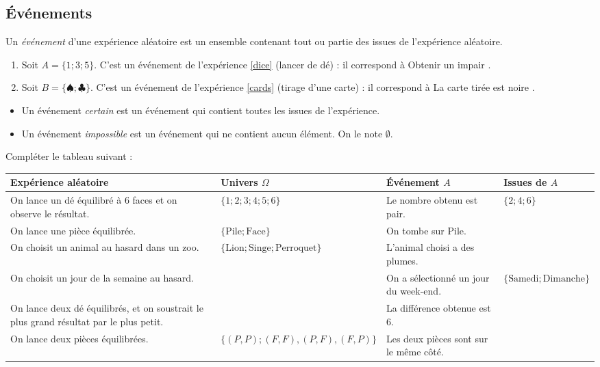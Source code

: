 \documentclass{article}
\begin{document}
\subsection{\'Evénements}
\begin{definition}
Un \emph{événement} d'une expérience aléatoire est un ensemble contenant tout ou partie des issues de l'expérience aléatoire.
\end{definition}
\begin{example}
\begin{enumerate}
\item Soit $A = \{1;3;5\}$. C'est un événement de l'expérience \ref{dice} (lancer de dé) : il correspond à \og Obtenir un impair \fg.
\item Soit $B = \{♠;♣\}$. C'est un événement de l'expérience \ref{cards} (tirage d'une carte) : il correspond à \og La carte tirée est noire \fg.
\end{enumerate}
\end{example}
\begin{vocabulary}
\begin{itemize}
\item Un événement \emph{certain} est un événement qui contient toutes les issues de l'expérience.  
\item Un événement \emph{impossible} est un événement qui ne contient aucun élément. On le note $\emptyset$.
\end{itemize}
\end{vocabulary}
\begin{exercize}
Compléter le tableau suivant :
\begin{center}
\begin{tabular}{|C{0.25\textwidth}|C{0.3\textwidth}|C{0.2\textwidth}|C{0.2\textwidth}|}
\hline
Expérience aléatoire & Univers $\Omega$ & \'Evénement $A$ & Issues de $A$ \\
\hline
On lance un dé équilibré à $6$ faces et on observe le résultat. & $\{1;2;3;4;5;6\}$ & Le nombre obtenu est pair. & $\{2;4;6\}$ \\
\hline
On lance une pièce équilibrée. & $\{\text{Pile};\text{Face}\}$ & On tombe sur Pile. & \\
\hline
On choisit un animal au hasard dans un zoo. & $\{\text{Lion};\text{Singe};\text{Perroquet}\}$ & L'animal choisi a des plumes. & \\
\hline
On choisit un jour de la semaine au hasard. & & On a sélectionné un jour du week-end. & $\{\text{Samedi};\text{Dimanche}\}$\\
\hline
On lance deux dé équilibrés, et on soustrait le plus grand résultat par le plus petit. & & La différence obtenue est $6$. & \\
\hline
On lance deux pièces équilibrées. & $\{(P,P);(F,F),(P,F),(F,P)\}$ & Les deux pièces sont sur le même côté. & \\
\hline 
\end{tabular}
\end{center}
\end{exercize}
\newpage
\end{document}
